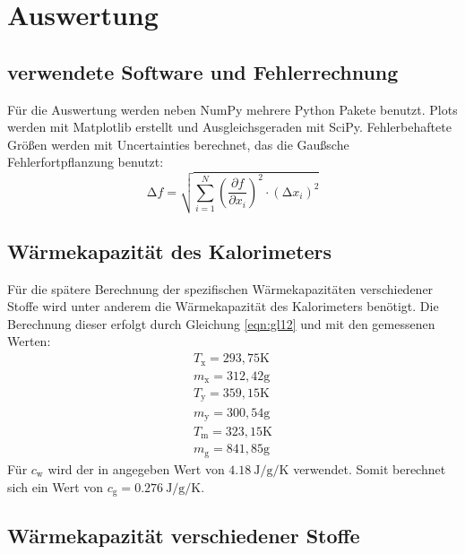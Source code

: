 \section{Auswertung}
\label{sec:Auswertung}

\subsection{verwendete Software und Fehlerrechnung}
\label{sec:SoftwareFehlerrechnung}

Für die Auswertung werden neben NumPy\cite{numpy} mehrere Python Pakete benutzt.
Plots werden mit Matplotlib\cite{matplotlib} erstellt und Ausgleichsgeraden mit SciPy\cite{scipy}.
Fehlerbehaftete Größen werden mit Uncertainties\cite{uncertainties} berechnet, das die Gaußsche Fehlerfortpflanzung benutzt:
\begin{equation*}
    \increment f = \sqrt{\sum_{i=1}^N \left( \frac{\partial f}{\partial x_i} \right)^{2} \cdot (\increment x_i)^{2}}
    \label{eqn:fehler}
\end{equation*}

\subsection{Wärmekapazität des Kalorimeters}
\label{sec:Kalorie}
Für die spätere Berechnung der spezifischen Wärmekapazitäten verschiedener Stoffe wird unter anderem die Wärmekapazität des Kalorimeters benötigt.
Die Berechnung dieser erfolgt durch Gleichung \eqref{eqn:gl12} und mit den gemessenen Werten:
\begin{align*}
 T_\text{x} = 293,75 \text{K}\\
 m_\text{x} = 312,42 \text{g}\\
 T_\text{y} = 359,15 \text{K}\\
 m_\text{y} = 300,54 \text{g}\\
 T_\text{m} = 323,15 \text{K}\\
 m_\text{g} = 841,85 \text{g}
\end{align*}
Für $c_\text{w}$ wird der in \cite{V201} angegeben Wert von $\SI{4,18}{\joule\per\gram\per\kelvin}$ verwendet.
Somit berechnet sich ein Wert von $ c_\text{g} = \SI{0,276}{\joule\per\gram\per\kelvin}.$

\subsection{Wärmekapazität verschiedener Stoffe}
\label{sec:verschiedeneStoffe}

